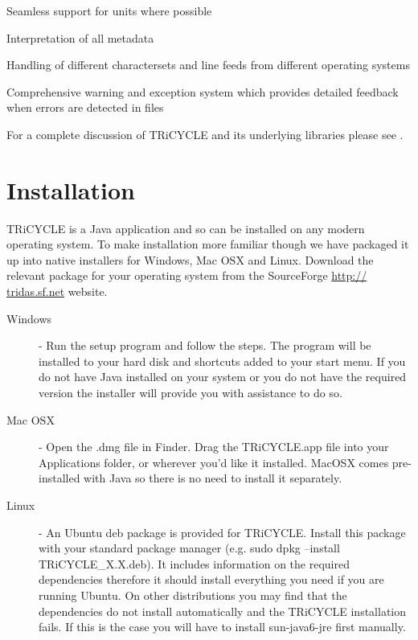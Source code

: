 \documentclass[10pt, headsepline,DIV14,BCOR0.5cm]{scrreprt}
\begin{document}
\begin{itemize*}
 \item Seamless support for units where possible
 \item Interpretation of all metadata
 \item Handling of different charactersets and line feeds from different operating systems
 \item Comprehensive warning and exception system which provides detailed feedback when errors are
detected in files
\end{itemize*}


For a complete discussion of TRiCYCLE and its underlying libraries please see \citep{tricycle}.


\chapter{Installation}

TRiCYCLE is a Java application and so can be installed on any modern operating system. To make
installation more familiar though we have packaged it up into native installers for Windows, Mac OSX
and Linux. Download the relevant package for your operating system from the SourceForge \url{http://
tridas.sf.net} website.

\begin{description}
 \item[Windows] - Run the setup program and follow the steps. The program will be installed to your hard disk
and shortcuts added to your start menu. If you do not have Java installed on your system or
you do not have the required version the installer will provide you with assistance to do so.
 \item[Mac OSX] - Open the .dmg file in Finder. Drag the TRiCYCLE.app file into your Applications folder, or
wherever you'd like it installed. MacOSX comes pre-installed with Java so there is no need
to install it separately.
 \item[Linux] - An Ubuntu deb package is provided for TRiCYCLE. Install this package with your standard
package manager (e.g. sudo dpkg --install TRiCYCLE\_X.X.deb). It includes information
on the required dependencies therefore it should install everything you need if you are
running Ubuntu. On other distributions you may find that the dependencies do not install
automatically and the TRiCYCLE installation fails. If this is the case you will have to install
sun-java6-jre first manually.
\end{description}
\end{document}
